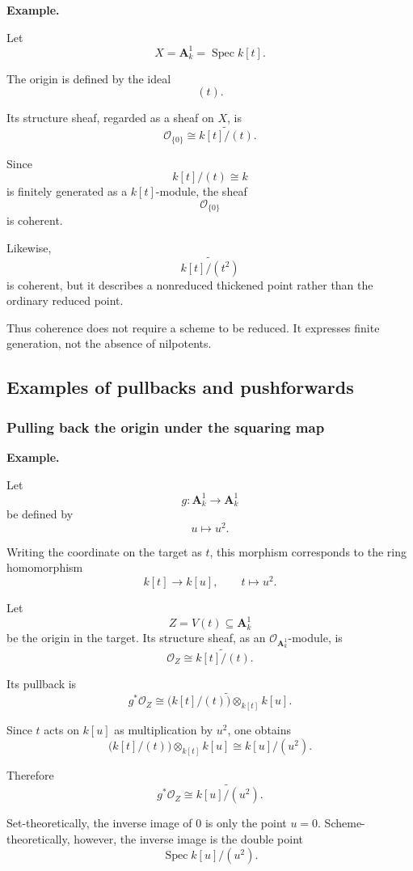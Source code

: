 \documentclass[12pt,a4paper]{article}
\theoremstyle{notespace}
\begin{document}
\textbf{Example.}

Let
\[
X=\mathbf A^1_k=\operatorname{Spec}k[t].
\]

The origin is defined by the ideal
\[
(t).
\]

Its structure sheaf, regarded as a sheaf on \(X\), is
\[
\mathcal O_{\{0\}}
\cong
\widetilde{k[t]/(t)}.
\]

Since
\[
k[t]/(t)\cong k
\]
is finitely generated as a \(k[t]\)-module, the sheaf
\[
\mathcal O_{\{0\}}
\]
is coherent.

Likewise,
\[
\widetilde{k[t]/(t^2)}
\]
is coherent, but it describes a nonreduced thickened point rather than the ordinary reduced point.

Thus coherence does not require a scheme to be reduced. It expresses finite generation, not the absence of nilpotents.

\subsection{Examples of pullbacks and pushforwards}

\subsubsection{Pulling back the origin under the squaring map}

\textbf{Example.}

Let
\[
g:\mathbf A^1_k\longrightarrow\mathbf A^1_k
\]
be defined by
\[
u\longmapsto u^2.
\]

Writing the coordinate on the target as \(t\), this morphism corresponds to the ring homomorphism
\[
k[t]\longrightarrow k[u],
\qquad
t\longmapsto u^2.
\]

Let
\[
Z=V(t)\subseteq\mathbf A^1_k
\]
be the origin in the target. Its structure sheaf, as an \(\mathcal O_{\mathbf A^1_k}\)-module, is
\[
\mathcal O_Z\cong\widetilde{k[t]/(t)}.
\]

Its pullback is
\[
g^*\mathcal O_Z
\cong
\widetilde{
	\bigl(k[t]/(t)\bigr)\otimes_{k[t]}k[u]
}.
\]

Since \(t\) acts on \(k[u]\) as multiplication by \(u^2\), one obtains
\[
\bigl(k[t]/(t)\bigr)\otimes_{k[t]}k[u]
\cong
k[u]/(u^2).
\]

Therefore
\[
\boxed{
	g^*\mathcal O_Z
	\cong
	\widetilde{k[u]/(u^2)}.
}
\]

Set-theoretically, the inverse image of \(0\) is only the point \(u=0\). Scheme-theoretically, however, the inverse image is the double point
\[
\operatorname{Spec}k[u]/(u^2).
\]
\end{document}
